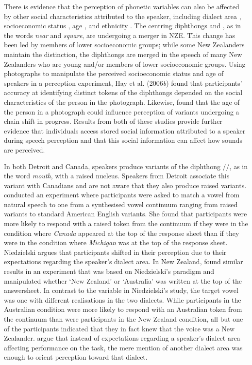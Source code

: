 There is evidence that the perception of phonetic variables can also be affected by other social characteristics at\-tri\-but\-ed to the spea\-ker, including dialect area \cite{niedzielski1999,haynolandrager2006}, socioeconomic status \cite{haywarrendrager2006}, age \cite{haywarrendrager2006,drager2006,dragerunderrev}, and ethnicity \cite{staumcasasanto2010}.  The centring diphthongs  and , as in the words \textit{near} and \textit{square}, are undergoing a merger in NZE.  This change has been led by members of lower socioeconomic groups; while some New Zealanders maintain the distinction, the diphthongs are merged in the speech of many New Zealanders who are young and/or members of lower socioeconomic groups.  Using photographs to manipulate the perceived socioeconomic status and age of speakers in a perception experiment, Hay et al. (2006\textit{b}) found that participants' accuracy at identifying distinct tokens of the diphthongs depended on the social characteristics of the person in the photograph.  Likewise,  found that the age of the person in a photograph could influence perception of variants undergoing a chain shift in progress.  Results from both of these studies provide further evidence that individuals access stored social information attributed to a speaker during speech perception and that this social information can affect how sounds are perceived.

In both Detroit and Canada, speakers produce variants of the diphthong //, as in the word \textit{mouth}, with a raised nucleus.  Speakers from Detroit associate this variant with Canadians and are not aware that they also produce raised variants.   conducted an experiment where participants were asked to match a vowel from natural speech to one from a synthesised vowel continuum ranging from raised variants to standard American English variants.  She found that participants were more likely to respond with a raised token from the continuum if they were in the condition where \textit{Canada} appeared at the top of the response sheet than if they were in the condition where \textit{Michigan} was at the top of the response sheet.  Niedzielski argues that participants shifted in their perception due to their expectations regarding the speaker's dialect area.  In New Zealand,  found similar results in an experiment that was based on Niedzielski's paradigm and manipulated whether `New Zealand' or `Australia' was written at the top of the answersheet.  In contrast to the variable in Niedzielski's study, the target vowel  was one with different realisations in the two dialects.  While participants in the Australian condition were more likely to respond with an Australian token from the continuum than were participants in the New Zealand condition, all but one of the participants indicated that they in fact knew that the voice was a New Zealander.   argue that instead of expectations regarding a speaker's dialect area affecting performance on the task, the mere mention of another dialect area was enough to orient perception toward that dialect.  

